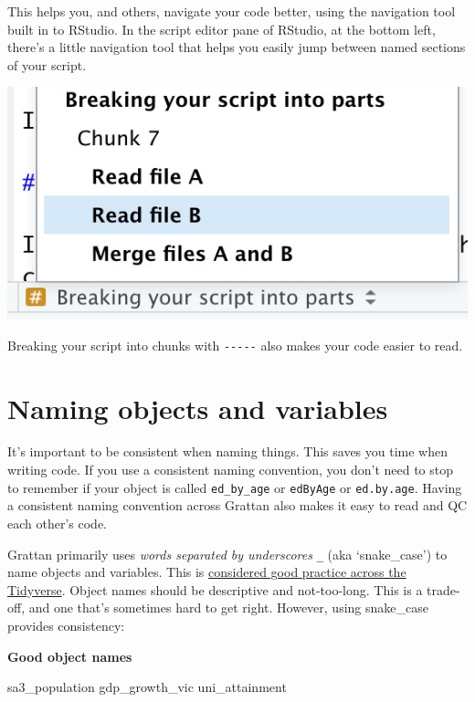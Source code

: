 \documentclass[]{book}
\newenvironment{Shaded}{\begin{snugshade}}{\end{snugshade}}
\newcommand{\NormalTok}[1]{#1}
\begin{document}
This helps you, and others, navigate your code better, using the navigation tool built in to RStudio. In the script editor pane of RStudio, at the bottom left, there's a little navigation tool that helps you easily jump between named sections of your script.

\includegraphics[width=7.64in]{atlas/rstudio_navigation}

Breaking your script into chunks with \texttt{-\/-\/-\/-\/-} also makes your code easier to read.

\hypertarget{naming-objects-and-variables}{%
\section{Naming objects and variables}\label{naming-objects-and-variables}}

It's important to be consistent when naming things. This saves you time when writing code. If you use a consistent naming convention, you don't need to stop to remember if your object is called \texttt{ed\_by\_age} or \texttt{edByAge} or \texttt{ed.by.age}. Having a consistent naming convention across Grattan also makes it easy to read and QC each other's code.

Grattan primarily uses \emph{words separated by underscores} \texttt{\_} (aka `snake\_case') to name objects and variables. This is \href{https://style.tidyverse.org/syntax.html\#object-names}{considered good practice across the Tidyverse}.
Object names should be descriptive and not-too-long. This is a trade-off, and one that's sometimes hard to get right. However, using snake\_case provides consistency:

\textbf{Good object names}

\begin{Shaded}
\begin{Highlighting}[]
\NormalTok{sa3_population}
\NormalTok{gdp_growth_vic}
\NormalTok{uni_attainment}
\end{Highlighting}
\end{Shaded}
\end{document}
